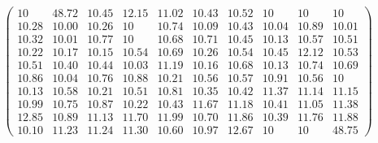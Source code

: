\documentclass[12pt,oneside,a4paper]{article}
\begin{document}
\begin{equation}
  \tag{Mean Tabu Duration for each city (alpha = 1 and 100 cities)}
  \begin{pmatrix} 10 & 48.72 & 10.45 & 12.15 & 11.02 & 10.43 & 10.52 & 10 & 10 & 10 \\
    10.28 & 10.00 & 10.26 & 10 & 10.74 & 10.09 & 10.43 & 10.04 & 10.89 & 10.01 \\
    10.32 & 10.01 & 10.77 & 10 & 10.68 & 10.71 & 10.45 & 10.13 & 10.57 & 10.51 \\
    10.22 & 10.17 & 10.15 & 10.54 & 10.69 & 10.26 & 10.54 & 10.45 & 12.12 & 10.53 \\
    10.51 & 10.40 & 10.44 & 10.03 & 11.19 & 10.16 & 10.68 & 10.13 & 10.74 & 10.69 \\
    10.86 & 10.04 & 10.76 & 10.88 & 10.21 & 10.56 & 10.57 & 10.91 & 10.56 & 10 \\
    10.13 & 10.58 & 10.21 & 10.51 & 10.81 & 10.35 & 10.42 & 11.37 & 11.14 & 11.15 \\
    10.99 & 10.75 & 10.87 & 10.22 & 10.43 & 11.67 & 11.18 & 10.41 & 11.05 & 11.38 \\
    12.85 & 10.89 & 11.13 & 11.70 & 11.99 & 10.70 & 11.86 & 10.39 & 11.76 & 11.88 \\
    10.10 & 11.23 & 11.24 & 11.30 & 10.60 & 10.97 & 12.67 & 10 & 10 & 48.75
  \end{pmatrix}
\end{equation}
\end{document}
